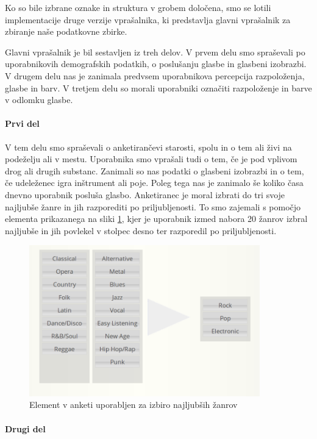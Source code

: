 \documentclass[a4paper, 12pt]{book}
\begin{document}
{Ko so bile izbrane oznake in struktura v grobem določena, smo se lotili implementacije druge verzije vprašalnika, ki predstavlja glavni vprašalnik za zbiranje naše podatkovne zbirke. 

Glavni vprašalnik je bil sestavljen iz treh delov. V prvem delu smo spraševali po uporabnikovih demografskih podatkih, o poslušanju glasbe in glasbeni izobrazbi. V drugem delu nas je zanimala predvsem uporabnikova percepcija razpoloženja, glasbe in barv. V tretjem delu so morali uporabniki označiti razpoloženje in barve v odlomku glasbe. 

\paragraph{Prvi del}

V tem delu smo spraševali o anketirančevi starosti, spolu in o tem ali živi na podeželju ali v mestu. Uporabnika smo vprašali tudi o tem, če je pod vplivom drog ali drugih substanc. Zanimali so nas podatki o glasbeni izobrazbi in o tem, če udeleženec igra inštrument ali poje. Poleg tega nas je zanimalo še koliko časa dnevno uporabnik posluša glasbo. Anketiranec je moral izbrati do tri svoje najljubše žanre in jih razporediti po priljubljenosti. To smo zajemali s pomočjo elementa prikazanega na sliki \ref{genresel}, kjer je uporabnik izmed nabora 20 žanrov izbral najljubše in jih povlekel v stolpec desno ter razporedil po priljubljenosti. 

\begin{figure}[h!t]
\centering
\includegraphics[width=10cm]{genresel.png}

\caption{Element v anketi uporabljen za izbiro najljubših žanrov}
\label{genresel}
\end{figure}

\paragraph{Drugi del}

}
\end{document}
